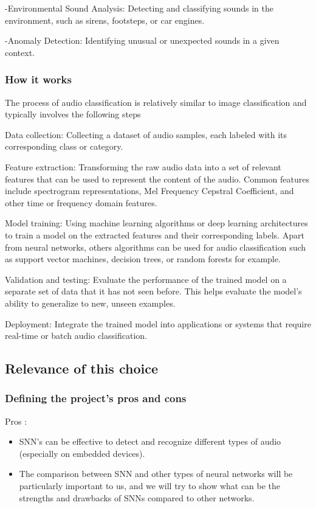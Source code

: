 \documentclass[11pt]{article}
\begin{document}
-Environmental Sound Analysis: Detecting and classifying sounds in the environment, such as sirens, footsteps, or car engines.

-Anomaly Detection: Identifying unusual or unexpected sounds in a given context.

\subsubsection{How it works}

The process of audio classification is relatively similar to image classification and typically involves the following steps

Data collection: Collecting a dataset of audio samples, each labeled with its corresponding class or category.

Feature extraction: Transforming the raw audio data into a set of relevant features that can be used to represent the content of the audio. Common features include spectrogram representations, Mel Frequency Cepstral Coefficient, and other time or frequency domain features.

Model training: Using machine learning algorithms or deep learning architectures to train a model on the extracted features and their corresponding labels. Apart from neural networks, others algorithms can be used for audio classification such as support vector machines, decision trees, or random forests for example.

Validation and testing: Evaluate the performance of the trained model on a separate set of data that it has not seen before. This helps evaluate the model's ability to generalize to new, unseen examples.

Deployment: Integrate the trained model into applications or systems that require real-time or batch audio classification.

\subsection{Relevance of this choice}
\subsubsection{Defining the project's pros and cons}
Pros :
\begin{itemize}
  \item SNN's can be effective to detect and recognize different types of audio (especially on embedded devices).
  \item The comparison between SNN and other types of neural networks will be particularly important to us, and we will try to show what can be the strengths and drawbacks of SNNs compared to other networks.
\end{itemize}
\end{document}

